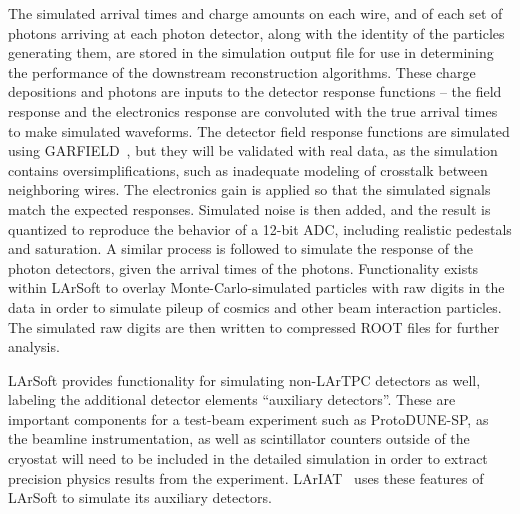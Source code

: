 The simulated arrival times and charge amounts on each wire, and of
each set of photons arriving at each photon detector, along with the
identity of the particles generating them, are stored in the
simulation output file for use in determining the performance of the
downstream reconstruction algorithms.  These charge depositions and
photons are inputs to the detector response functions -- the field
response and the electronics response are convoluted with the true
arrival times to make simulated waveforms.  The detector field
response functions are simulated using GARFIELD~\cite{garfield}, but
they will be validated with real data, as the simulation contains
oversimplifications, such as inadequate modeling of crosstalk between
neighboring wires.  The electronics gain is applied so that the
simulated signals match the expected responses.  Simulated noise is
then added, and the result is quantized to reproduce the behavior of a
12-bit ADC, including realistic pedestals and saturation.  A similar
process is followed to simulate the response of the photon detectors,
given the arrival times of the photons.  Functionality exists within
LArSoft to overlay Monte-Carlo-simulated particles with raw digits in
the data in order to simulate pileup of cosmics and other beam
interaction particles. The simulated raw digits are then written to
compressed ROOT files for further analysis.

LArSoft provides functionality for simulating non-LArTPC detectors as
well, labeling the additional detector elements ``auxiliary
detectors''.  These are important components for a test-beam
experiment such as ProtoDUNE-SP, as the beamline instrumentation, as
well as scintillator counters outside of the cryostat will need to be
included in the detailed simulation in order to extract precision
physics results from the experiment.  LArIAT~\cite{lariat} uses these
features of LArSoft to simulate its auxiliary detectors.